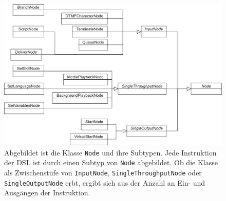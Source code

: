 \begin{figure} %
	\centering
		\includegraphics[width=\textwidth]{img/NodeHierarchy.png}
	\caption[Klassenhierarchie der Klasse \texttt{Node}]{Abgebildet ist die Klasse \texttt{Node} und ihre Subtypen. Jede Instruktion der DSL ist durch einen Subtyp von \texttt{Node} abgebildet. Ob die Klasse als Zwischenstufe von \texttt{InputNode}, \texttt{SingleThroughputNode} oder \texttt{SingleOutputNode} erbt, ergibt sich aus der Anzahl an Ein- und Ausgängen der Instruktion.}
	\label{fig:UML:Node-Hierarchy}
\end{figure}

